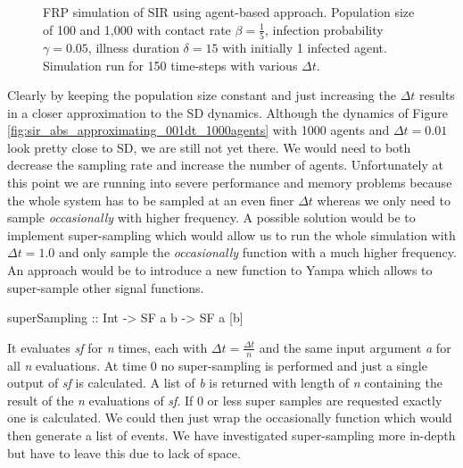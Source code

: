 \begin{figure}
\begin{center}
	\caption{FRP simulation of SIR using agent-based approach. Population size of 100 and 1,000 with contact rate $\beta = \frac{1}{5}$, infection probability $\gamma = 0.05$, illness duration $\delta = 15$ with initially 1 infected agent. Simulation run for 150 time-steps with various $\Delta t$.} 
	\label{fig:sir_abs_dynamics_frp}
\end{center}
\end{figure}

Clearly by keeping the population size constant and just increasing the $\Delta t$ results in a closer approximation to the SD dynamics. Although the dynamics of Figure \ref{fig:sir_abs_approximating_001dt_1000agents} with 1000 agents and $\Delta t = 0.01$ look pretty close to SD, we are still not yet there. We would need to both decrease the sampling rate and increase the number of agents. Unfortunately at this point we are running into severe performance and memory problems because the whole system has to be sampled at an even finer $\Delta t$ whereas we only need to sample \textit{occasionally} with higher frequency. A possible solution would be to implement super-sampling which would allow us to run the whole simulation with $\Delta t = 1.0$ and only sample the \textit{occasionally} function with a much higher frequency. An approach would be to introduce a new function to Yampa which allows to super-sample other signal functions. 

\begin{HaskellCode}
superSampling :: Int -> SF a b -> SF a [b]
\end{HaskellCode}

It evaluates \textit{sf} for \textit{n} times, each with $\Delta t = \frac{\Delta t}{n}$ and the same input argument \textit{a} for all \textit{n} evaluations. At time 0 no super-sampling is performed and just a single output of \textit{sf} is calculated. A list of \textit{b} is returned with length of \textit{n} containing the result of the \textit{n} evaluations of \textit{sf}. If 0 or less super samples are requested exactly one is calculated. We could then just wrap the occasionally function which would then generate a list of events. We have investigated super-sampling more in-depth but have to leave this due to lack of space.

